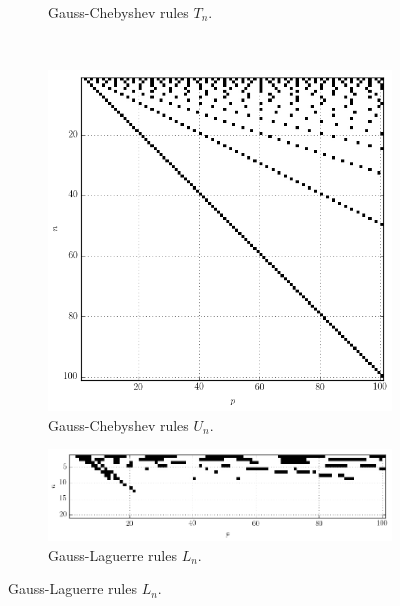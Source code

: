 \documentclass[a4paper,10pt]{article}
\begin{document}
\begin{figure}[ht!]
\begin{minipage}[b]{0.49\linewidth}
\begin{subfigure}[b]{\linewidth}
    \caption{Gauss-Chebyshev rules $T_n$.}
    \label{fig:map_chebt_50_50}
  \end{subfigure}
  \end{minipage} \\
  \begin{minipage}[t][][t]{0.49\linewidth}
  \vspace{0pt}
  \begin{subfigure}[b]{\linewidth}
    \includegraphics[width=\textwidth]{./img/map_chebu_100_100.png}
    \caption{Gauss-Chebyshev rules $U_n$.}
    \label{fig:map_chebu_100_100}
  \end{subfigure}
  \end{minipage}
  \hfill
  \begin{minipage}[t][][t]{0.49\linewidth}
  \vspace{0pt}
  \begin{subfigure}[t]{\textwidth}
    \includegraphics[width=\textwidth]{./img/map_lag_20_100.png}
    \caption{Gauss-Laguerre rules $L_n$.\vspace{0.3cm}}

\end{subfigure}
\end{minipage}
\end{figure}
\end{document}
